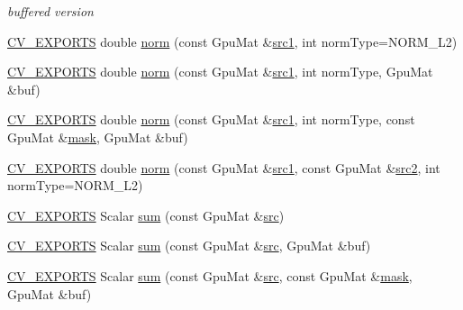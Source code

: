 \begin{DoxyCompactItemize}
\begin{DoxyCompactList}\small\item\em buffered version \end{DoxyCompactList}\item 
\hyperlink{core_2types__c_8h_a1bf9f0e121b54272da02379cfccd0a2b}{C\-V\-\_\-\-E\-X\-P\-O\-R\-T\-S} double \hyperlink{namespacecv_1_1gpu_ae9da8cdd56d17c434f5f0a0414f70806}{norm} (const Gpu\-Mat \&\hyperlink{core__c_8h_a897de4702c922f4cccda0d57ccdcafb3}{src1}, int norm\-Type=N\-O\-R\-M\-\_\-\-L2)
\item 
\hyperlink{core_2types__c_8h_a1bf9f0e121b54272da02379cfccd0a2b}{C\-V\-\_\-\-E\-X\-P\-O\-R\-T\-S} double \hyperlink{namespacecv_1_1gpu_a2b8655a437270239001f9ca9f7e0762c}{norm} (const Gpu\-Mat \&\hyperlink{core__c_8h_a897de4702c922f4cccda0d57ccdcafb3}{src1}, int norm\-Type, Gpu\-Mat \&buf)
\item 
\hyperlink{core_2types__c_8h_a1bf9f0e121b54272da02379cfccd0a2b}{C\-V\-\_\-\-E\-X\-P\-O\-R\-T\-S} double \hyperlink{namespacecv_1_1gpu_ad3618f731c7636d95c298883ba4f425c}{norm} (const Gpu\-Mat \&\hyperlink{core__c_8h_a897de4702c922f4cccda0d57ccdcafb3}{src1}, int norm\-Type, const Gpu\-Mat \&\hyperlink{tracking_8hpp_a6b13ecd2fd6ec7ad422f1d7863c3ad19}{mask}, Gpu\-Mat \&buf)
\item 
\hyperlink{core_2types__c_8h_a1bf9f0e121b54272da02379cfccd0a2b}{C\-V\-\_\-\-E\-X\-P\-O\-R\-T\-S} double \hyperlink{namespacecv_1_1gpu_ac930d10b0f90e23d66937ba1d72cf915}{norm} (const Gpu\-Mat \&\hyperlink{core__c_8h_a897de4702c922f4cccda0d57ccdcafb3}{src1}, const Gpu\-Mat \&\hyperlink{core__c_8h_a7561a36d48069d54a6c8ac4e4750edfd}{src2}, int norm\-Type=N\-O\-R\-M\-\_\-\-L2)
\item 
\hyperlink{core_2types__c_8h_a1bf9f0e121b54272da02379cfccd0a2b}{C\-V\-\_\-\-E\-X\-P\-O\-R\-T\-S} Scalar \hyperlink{namespacecv_1_1gpu_a5292ab871ffc965df3968dbe6b9f7b20}{sum} (const Gpu\-Mat \&\hyperlink{legacy_8hpp_a371cd109b74033bc4366f584edd3dacc}{src})
\item 
\hyperlink{core_2types__c_8h_a1bf9f0e121b54272da02379cfccd0a2b}{C\-V\-\_\-\-E\-X\-P\-O\-R\-T\-S} Scalar \hyperlink{namespacecv_1_1gpu_afbd8203c9a5a240502171e1014279349}{sum} (const Gpu\-Mat \&\hyperlink{legacy_8hpp_a371cd109b74033bc4366f584edd3dacc}{src}, Gpu\-Mat \&buf)
\item 
\hyperlink{core_2types__c_8h_a1bf9f0e121b54272da02379cfccd0a2b}{C\-V\-\_\-\-E\-X\-P\-O\-R\-T\-S} Scalar \hyperlink{namespacecv_1_1gpu_a93eff250ec7d85ebb20a845d8ff81eb1}{sum} (const Gpu\-Mat \&\hyperlink{legacy_8hpp_a371cd109b74033bc4366f584edd3dacc}{src}, const Gpu\-Mat \&\hyperlink{tracking_8hpp_a6b13ecd2fd6ec7ad422f1d7863c3ad19}{mask}, Gpu\-Mat \&buf)

\end{DoxyCompactItemize}
